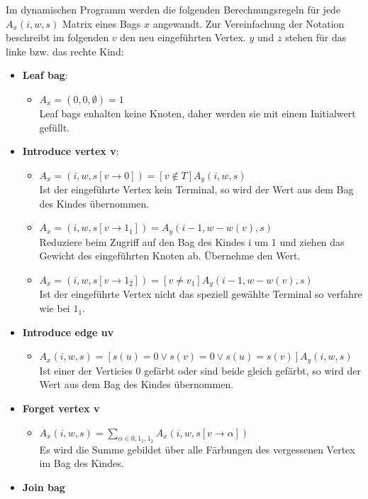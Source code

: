 Im dynamischen Programm werden die folgenden Berechnungsregeln für jede $A_x(i,w,s)$ Matrix eines Bags $x$ angewandt. Zur Vereinfachung der Notation beschreibt im folgenden $v$ den neu eingeführten Vertex. $y$ und $z$ stehen für das linke bzw. das rechte Kind:
\begin{itemize}
\item \textbf{Leaf bag}:
\begin{itemize}
\item $A_x=(0,0,\emptyset) = 1$\\Leaf bags enhalten keine Knoten, daher werden sie mit einem Initialwert gefüllt.
\end{itemize}
\item \textbf{Introduce vertex v}:
\begin{itemize}
\item $A_x=(i,w,s[v\rightarrow 0]) = [v \notin T]A_y(i,w,s)$\\ Ist der eingeführte Vertex kein Terminal, so wird der Wert aus dem Bag des Kindes übernommen.
\item $A_x=(i,w,s[v\rightarrow 1_1]) = A_y(i-1,w-w(v),s)$\\ Reduziere beim Zugriff auf den Bag des Kindes i um 1 und ziehen das Gewicht des eingeführten Knoten ab. Übernehme den Wert.
\item $A_x=(i,w,s[v\rightarrow 1_2]) =[v \neq v_1] A_y(i-1,w-w(v),s)$\\ Ist der eingeführte Vertex nicht das speziell gewählte Terminal so verfahre wie bei $1_1$.
\end{itemize}
\item \textbf{Introduce edge uv}
\begin{itemize}
\item $A_x(i,w,s) = [s(u) = 0 \vee s(v) = 0 \vee s(u) = s(v)]A_y(i,w,s)$\\ Ist einer der Verticies $0$ gefärbt oder sind beide gleich gefärbt, so wird der Wert aus dem Bag des Kindes übernommen.
\end{itemize}
\item \textbf{Forget vertex v}
\begin{itemize}
\item $A_x(i,w,s) = \sum\limits_{\alpha \in {0,1_1,1_2}} A_x(i,w,s[v \rightarrow \alpha]) $\\ Es wird die Summe gebildet über alle Färbungen des vergessenen Vertex im Bag des Kindes.
\end{itemize}
\item \textbf{Join bag}
\begin{itemize}

\end{itemize}
\end{itemize}
